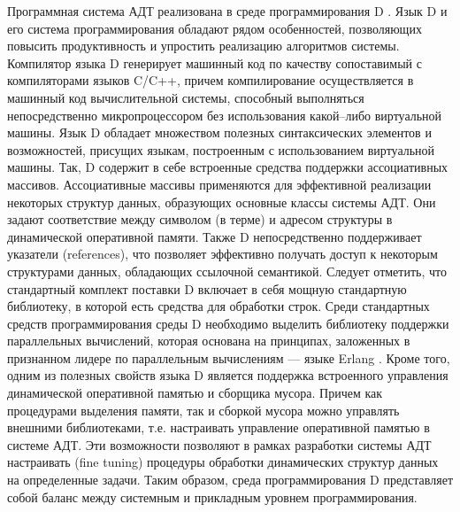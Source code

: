 Программная система АДТ реализована в среде программирования D \cite{DPL1,DPL2}. Язык D и его система программирования обладают рядом особенностей, позволяющих повысить продуктивность и упростить реализацию алгоритмов системы. Компилятор языка D генерирует машинный код по качеству сопоставимый с компиляторами языков C/C++, причем компилирование осуществляется в машинный код вычислительной системы, способный выполняться непосредственно микропроцессором без использования какой--либо виртуальной машины. Язык D обладает множеством полезных синтаксических элементов и возможностей, присущих языкам, построенным с использованием виртуальной машины. Так, D содержит в себе встроенные средства поддержки ассоциативных массивов. Ассоциативные массивы применяются для эффективной реализации некоторых структур данных, образующих основные классы системы АДТ. Они задают соответствие между символом (в терме) и адресом структуры в динамической оперативной памяти. Также D непосредственно поддерживает указатели (references), что позволяет эффективно получать доступ к некоторым структурами данных, обладающих ссылочной семантикой. Следует отметить, что стандартный комплект поставки D включает в себя мощную стандартную библиотеку, в которой есть средства для обработки строк. Среди стандартных средств программирования среды D необходимо выделить библиотеку поддержки параллельных вычислений, которая основана на принципах, заложенных в признанном лидере по параллельным вычислениям --- языке Erlang \cite{erlang}. Кроме того, одним из полезных свойств языка D является поддержка встроенного управления динамической оперативной памятью и сборщика мусора. Причем как процедурами выделения памяти, так и сборкой мусора можно управлять внешними библиотеками, т.е. настраивать управление оперативной памятью в системе АДТ. Эти возможности позволяют в рамках разработки системы АДТ настраивать (fine tuning) процедуры обработки динамических структур данных на определенные задачи. Таким образом, среда программирования D представляет собой баланс между системным и прикладным уровнем программирования.





